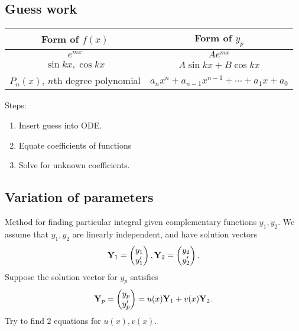 \documentclass[10pt]{article}
\begin{document}
    \subsection{Guess work}
    \begin{center}
        \begin{tabular}{cc}
        \toprule
        Form of $f(x)$ & Form of $y_p$ \\ \midrule
        $ e^{mx} $ & $ Ae^{mx} $ \\
        $ \sin kx, \cos kx $ & $ A \sin kx + B \cos kx $ \\
        $ P_n(x) $, $n$th degree polynomial & $ a_nx^n+a_{n-1}x^{n-1}+\cdots+a_1x+a_0 $ \\ \bottomrule
        \end{tabular}
        \end{center}
        Steps:
        \begin{enumerate}
            \item Insert guess into ODE.
            \item Equate coefficients of functions
            \item Solve for unknown coefficients.
        \end{enumerate}
    \subsection{Variation of parameters}
    Method for finding particular integral given complementary functions $ y_1,y_2 $. We assume that $ y_1,y_2 $ are linearly independent, and have solution vectors 
    \[
        \mathbf{Y}_1=\begin{pmatrix}
            y_1\\y_1'
        \end{pmatrix},
        {\bf Y}_2=\begin{pmatrix}
            y_2\\y_2'
        \end{pmatrix}
    .\]
    Suppose the solution vector for $ y_p $ satisfies
    \begin{equation}\label{eq:14.1}
        {\bf Y}_p=\begin{pmatrix}
            y_p\\y_p'
        \end{pmatrix}
        =u(x){\bf Y}_1+v(x){\bf Y}_2.
    \end{equation}
    Try to find 2 equations for $u(x),v(x)$.
\end{document}
